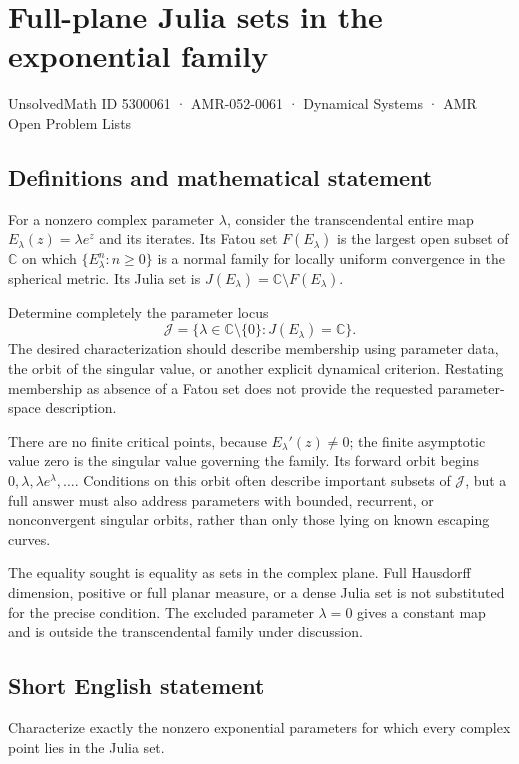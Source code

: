 \documentclass[11pt,a4paper]{article}
\begin{document}
\section*{Full-plane Julia sets in the exponential family}\label{5300061}
{\small UnsolvedMath ID 5300061 · AMR-052-0061 · Dynamical Systems · AMR Open Problem Lists}
\subsection{Definitions and mathematical statement}
For a nonzero complex parameter $\lambda$, consider the transcendental
entire map $E_\lambda(z)=\lambda e^z$ and its iterates. Its Fatou set
$F(E_\lambda)$ is the largest open subset of $\mathbb C$ on which
$\{E_\lambda^n:n\ge0\}$ is a normal family for locally uniform
convergence in the spherical metric. Its Julia set is
$J(E_\lambda)=\mathbb C\setminus F(E_\lambda)$.

Determine completely the parameter locus
\[
 \mathcal J=\{\lambda\in\mathbb C\setminus\{0\}:
                       J(E_\lambda)=\mathbb C\}.
\]
The desired characterization should describe membership using parameter
data, the orbit of the singular value, or another explicit dynamical
criterion. Restating membership as absence of a Fatou set does not
provide the requested parameter-space description.

There are no finite critical points, because $E_\lambda'(z)\ne0$;
the finite asymptotic value zero is the singular value governing
the family. Its forward orbit begins $0,\lambda,\lambda e^\lambda,
\ldots$. Conditions on this orbit often describe important subsets
of $\mathcal J$, but a full answer must also address parameters with
bounded, recurrent, or nonconvergent singular orbits, rather than
only those lying on known escaping curves.

The equality sought is equality as sets in the complex plane. Full
Hausdorff dimension, positive or full planar measure, or a dense
Julia set is not substituted for the precise condition. The excluded
parameter $\lambda=0$ gives a constant map and is outside the
transcendental family under discussion.
\subsection{Short English statement}
Characterize exactly the nonzero exponential parameters for which every complex point lies in the Julia set.
\end{document}
